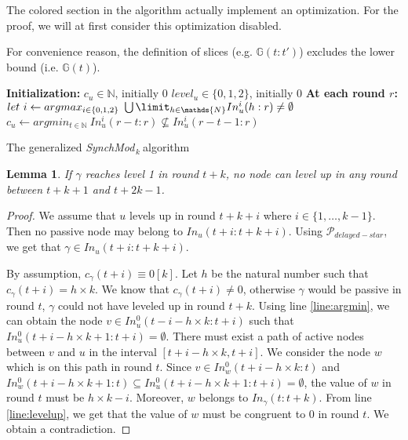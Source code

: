 \documentclass[11pt,letterpaper]{article}
\newtheorem{lem}[thm]{Lemma}
\newcommand{\cent}{\gamma}
\newcommand{\SM}{{\em SynchMod}$_{\,k}\ $}
\begin{document}
The colored section in the algorithm actually implement an optimization.
For the proof, we will at first consider this optimization disabled.

For convenience reason, the definition of slices (e.g. $\mathds{G}(t:t')$) excludes the lower bound (i.e. $\mathds{G}(t)$).

\begin{algorithm}[htb]
	\DontPrintSemicolon
	\textbf{Initialization:} \;
	\Indp
		$c_u \in \mathds{N}$, initially 0 \;
		$level_u \in \{0, 1, 2\}$, initially 0 \;
	\BlankLine
	\Indm
	\textbf{At each round $r$:} \;
	\Indp
		$let~i \leftarrow argmax_{i \in \{0, 1, 2\}}~\bigcup\limit_{h \in \mathds{N}} In_u^i(h:r) \neq \emptyset$ \;\label{line:argmax}
		$c_u \leftarrow argmin_{t \in \mathds{N}}~In_u^i(r-t:r) \nsubseteq In_u^i(r-t-1:r)$ \;\label{line:argmin} 
	\Indm
\caption{The generalized \SM algorithm} 
\end{algorithm}

\begin{lem} \label{lem:no-close-levelup}
	If $\cent$ reaches level 1 in round $t+k$, no node can level up in any round between $t+k+1$ and $t+2k-1$.
\end{lem}
\begin{proof}
	We assume that $u$ levels up in round $t+k+i$ where $i \in \{1, \dots, k-1\}$.
	Then no passive node may belong to $In_u(t+i:t+k+i)$.
	Using $\mathcal{P}_{delayed-star}$, we get that $\cent \in In_u(t+i:t+k+i)$.

	By assumption, $c_\cent(t+i) \equiv 0 [k]$. Let $h$ be the natural number such that $c_\cent(t+i) = h \times k$.
	We know that $c_\cent(t+i) \neq 0$, otherwise $\cent$ would be passive in round $t$, $\cent$ could not have leveled up in round $t+k$.
	Using line \ref{line:argmin}, we can obtain the node $v \in In_u^0(t-i-h\times k:t+i)$ such that $In_u^0(t+i-h\times k+1:t+i) = \emptyset$.
	There must exist a path of active nodes between $v$ and $u$ in the interval $[t+i-h\times k, t+i]$.
	We consider the node $w$ which is on this path in round $t$.
	Since $v \in In_w^0(t+i-h\times k:t)$ and $In_w^0(t+i-h\times k+1:t) \subseteq In_u^0(t+i-h\times k+1:t+i) = \emptyset$,
	the value of $w$ in round $t$ must be $h\times k - i$.
	Moreover, $w$ belongs to $In_\cent(t:t+k)$. From line \ref{line:levelup}, we get that the value of $w$ must be congruent to 0 in round $t$.
	We obtain a contradiction.
\end{proof}
\end{document}
